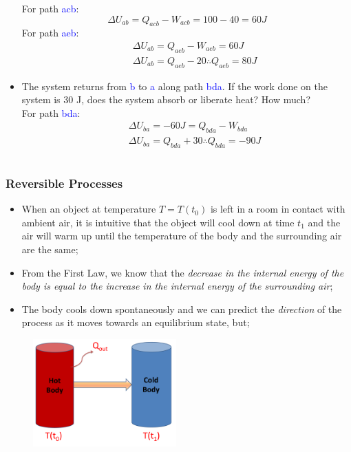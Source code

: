 \documentclass[10pt,compress,handout,ignorenonframetext]{beamer}
\begin{document}
\begin{frame}
\begin{columns}
\begin{column}[r]{0.5\linewidth}
\begin{itemize}
          For path \textcolor{blue}{acb}:
          \begin{displaymath}
           \Delta U_{ab} = Q_{acb}-W_{acb} = 100 - 40 = 60 J
          \end{displaymath}
          For path \textcolor{blue}{aeb}:
          \begin{eqnarray}
           &&\Delta U_{ab} = Q_{aeb}-W_{aeb} = 60 J \nonumber \\
           &&\Delta U_{ab} = Q_{aeb}-20 \therefore Q_{aeb} = 80 J \nonumber
          \end{eqnarray}
    \item<3-> The system returns from \textcolor{blue}{b} to \textcolor{blue}{a} along path \textcolor{blue}{bda}. If the work done on the system is 30 J, does the system absorb or liberate heat? How much? \\
           For path \textcolor{blue}{bda}: 
           \begin{eqnarray}
            &&\Delta U_{ba} = -60 J = Q_{bda}-W_{bda} \nonumber \\
            &&\Delta U_{ba} = Q_{bda} + 30 \therefore Q_{bda} = -90 J \nonumber
           \end{eqnarray}
   \end{itemize}
  \end{column}
 \end{columns}
\normalsize
\end{frame}


\begin{frame}
 \frametitle{Reversible Processes}
   \begin{itemize}
    \item When an object at temperature $T=T\left(t_{0}\right)$ is left in a room in contact with ambient air, it is intuitive that the object will cool down at time $t_{1}$ and the air will warm up until the temperature of the body and the surrounding air are the same;
    \item From the First Law, we know that the {\it decrease in the internal energy of the body is equal to the increase in the internal energy of the surrounding air};
    \item The body cools down spontaneously and we can predict the {\it direction} of the process as it moves towards an equilibrium state, but; 
   \end{itemize}
    \begin{figure}%
     \begin{center}
      \includegraphics[width=5.5cm,clip]{./Pics/HotColdCoffee}
     \end{center}
    \end{figure}
 \normalsize
\end{frame}
\end{document}

